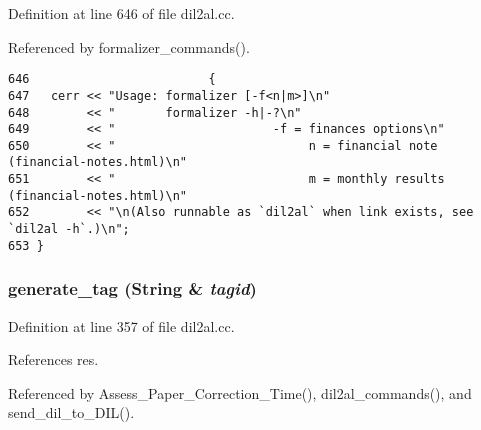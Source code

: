 Definition at line 646 of file dil2al.cc.

Referenced by formalizer\_\-commands().



\footnotesize\begin{verbatim}646                         {
647   cerr << "Usage: formalizer [-f<n|m>]\n"
648        << "       formalizer -h|-?\n"
649        << "                      -f = finances options\n"
650        << "                           n = financial note (financial-notes.html)\n"
651        << "                           m = monthly results (financial-notes.html)\n"
652        << "\n(Also runnable as `dil2al` when link exists, see `dil2al -h`.)\n";
653 }
\end{verbatim}\normalsize 
{}
\subsubsection{ generate\_\-tag ({\bf String} \& {\em tagid})}\label{dil2al_8cc_a103}




Definition at line 357 of file dil2al.cc.

References res.

Referenced by Assess\_\-Paper\_\-Correction\_\-Time(), dil2al\_\-commands(), and send\_\-dil\_\-to\_\-DIL().



